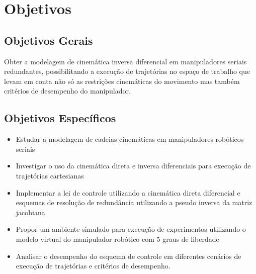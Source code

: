 
\section{Objetivos}\label{sec:objectives}

\subsection{Objetivos Gerais}

Obter a modelagem de cinemática inversa diferencial em manipuladores seriais redundantes, possibilitando a execução de
trajetórias no espaço de trabalho que levam em conta não só as restrições cinemáticas do movimento mas também critérios
de desempenho do manipulador.

\subsection{Objetivos Específicos}
\begin{itemize}
	\item Estudar a modelagem de cadeias cinemáticas em manipuladores robóticos seriais
	\item Investigar o uso da cinemática direta e inversa diferenciais para execução de trajetórias cartesianas
	\item Implementar a lei de controle utilizando a cinemática direta diferencial e esquemas de resolução de redundância utilizando a pseudo inversa da matriz jacobiana
	\item Propor um ambiente simulado para execução de experimentos utilizando o modelo virtual do manipulador robótico com 5 graus de liberdade
	\item Analisar o desempenho do esquema de controle em diferentes cenários de execução de trajetórias e critérios de desempenho.
\end{itemize}

